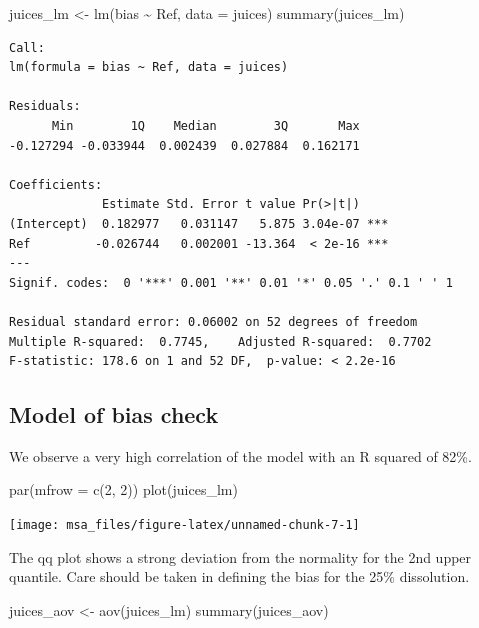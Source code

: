 \documentclass[
]{book}
\newenvironment{Shaded}{\begin{snugshade}}{\end{snugshade}}
\newcommand{\AttributeTok}[1]{\textcolor[rgb]{0.77,0.63,0.00}{#1}}
\newcommand{\DecValTok}[1]{\textcolor[rgb]{0.00,0.00,0.81}{#1}}
\newcommand{\FunctionTok}[1]{\textcolor[rgb]{0.00,0.00,0.00}{#1}}
\newcommand{\NormalTok}[1]{#1}
\newcommand{\OtherTok}[1]{\textcolor[rgb]{0.56,0.35,0.01}{#1}}
\newcommand{\SpecialCharTok}[1]{\textcolor[rgb]{0.00,0.00,0.00}{#1}}
\begin{document}
\begin{Shaded}
\begin{Highlighting}[]
\NormalTok{juices\_lm }\OtherTok{\textless{}{-}} \FunctionTok{lm}\NormalTok{(bias }\SpecialCharTok{\textasciitilde{}}\NormalTok{ Ref,}
                    \AttributeTok{data =}\NormalTok{ juices)}
\FunctionTok{summary}\NormalTok{(juices\_lm)}
\end{Highlighting}
\end{Shaded}

\begin{verbatim}
Call:
lm(formula = bias ~ Ref, data = juices)

Residuals:
      Min        1Q    Median        3Q       Max 
-0.127294 -0.033944  0.002439  0.027884  0.162171 

Coefficients:
             Estimate Std. Error t value Pr(>|t|)    
(Intercept)  0.182977   0.031147   5.875 3.04e-07 ***
Ref         -0.026744   0.002001 -13.364  < 2e-16 ***
---
Signif. codes:  0 '***' 0.001 '**' 0.01 '*' 0.05 '.' 0.1 ' ' 1

Residual standard error: 0.06002 on 52 degrees of freedom
Multiple R-squared:  0.7745,	Adjusted R-squared:  0.7702 
F-statistic: 178.6 on 1 and 52 DF,  p-value: < 2.2e-16
\end{verbatim}

\hypertarget{model-of-bias-check}{%
\subsection{Model of bias check}\label{model-of-bias-check}}

We observe a very high correlation of the model with an R squared of 82\%.

\begin{Shaded}
\begin{Highlighting}[]
\FunctionTok{par}\NormalTok{(}\AttributeTok{mfrow =} \FunctionTok{c}\NormalTok{(}\DecValTok{2}\NormalTok{, }\DecValTok{2}\NormalTok{))}
\FunctionTok{plot}\NormalTok{(juices\_lm)}
\end{Highlighting}
\end{Shaded}

\texttt{[image: msa\_files/figure-latex/unnamed-chunk-7-1]}

The qq plot shows a strong deviation from the normality for the 2nd upper quantile. Care should be taken in defining the bias for the 25\% dissolution.

\begin{Shaded}
\begin{Highlighting}[]
\NormalTok{juices\_aov }\OtherTok{\textless{}{-}} \FunctionTok{aov}\NormalTok{(juices\_lm)}
\FunctionTok{summary}\NormalTok{(juices\_aov)}
\end{Highlighting}
\end{Shaded}
\end{document}
